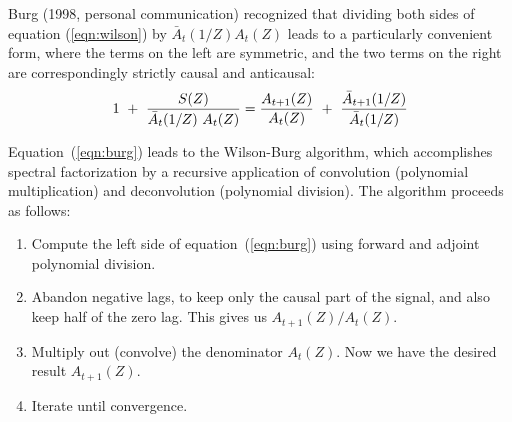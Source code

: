 Burg (1998, personal communication) recognized that dividing both
sides of equation (\ref{eqn:wilson}) by $\bar A_t(1/Z) A_t(Z)$ leads
to a particularly convenient form, where the terms on the left are
symmetric, and the two terms on the right are correspondingly strictly
causal and anticausal:
\begin{equation} \label{eqn:burg}
1 \ +\ {S(Z) \over \bar A_t(1/Z)\  A_t(Z)} =
{A_{t+1}(Z) \over A_t(Z)}
\ +\
{\bar A_{t+1}(1/Z) \over \bar A_t(1/Z)}
\end{equation}
\par
Equation~(\ref{eqn:burg}) leads to the Wilson-Burg algorithm, which
accomplishes spectral factorization by a recursive application of
convolution (polynomial multiplication) and deconvolution (polynomial
division). The algorithm proceeds as follows:
\begin{enumerate}
\item Compute the left side of equation~(\ref{eqn:burg}) using forward
  and adjoint polynomial division.
\item Abandon negative lags, to keep only the causal part of the
  signal, and also keep half of the zero lag. This gives us
  $A_{t+1}(Z)/A_t(Z)$.
\item Multiply out (convolve) the denominator $A_t(Z)$. Now we have
the desired result $A_{t+1}(Z)$.
\item Iterate until convergence.  
\end{enumerate}


